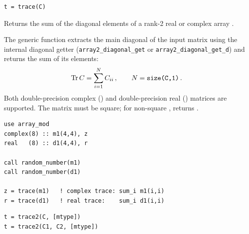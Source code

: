 \lstset{language=[95]Fortran}
\begin{lstlisting}
t = trace(C)
\end{lstlisting}

Returns the sum of the diagonal elements of a rank-2 real or complex array .

The generic function  extracts the main diagonal of the input matrix  using the internal diagonal getter (\texttt{array2\_diagonal\_get} or \texttt{array2\_diagonal\_get\_d}) and returns the sum of its elements:
\begin{align}
  {\rm Tr\,} C = \sum_{i=1}^{N} C_{ii}\, , \qquad N = \texttt{size(C,1)}\, .
\end{align}
Both double-precision complex () and double-precision real () matrices are supported. The matrix  must be square; for non-square ,  returns .

\begin{description}[leftmargin=2.2cm, style=nextline]
\end{description}

\lstset{language=[95]Fortran}
\begin{lstlisting}
use array_mod
complex(8) :: m1(4,4), z
real   (8) :: d1(4,4), r

call random_number(m1)
call random_number(d1)

z = trace(m1)   ! complex trace: sum_i m1(i,i)
r = trace(d1)   ! real trace:    sum_i d1(i,i)
\end{lstlisting}


\lstset{language=[95]Fortran}
\begin{lstlisting}
t = trace2(C, [mtype])
t = trace2(C1, C2, [mtype])
\end{lstlisting}

